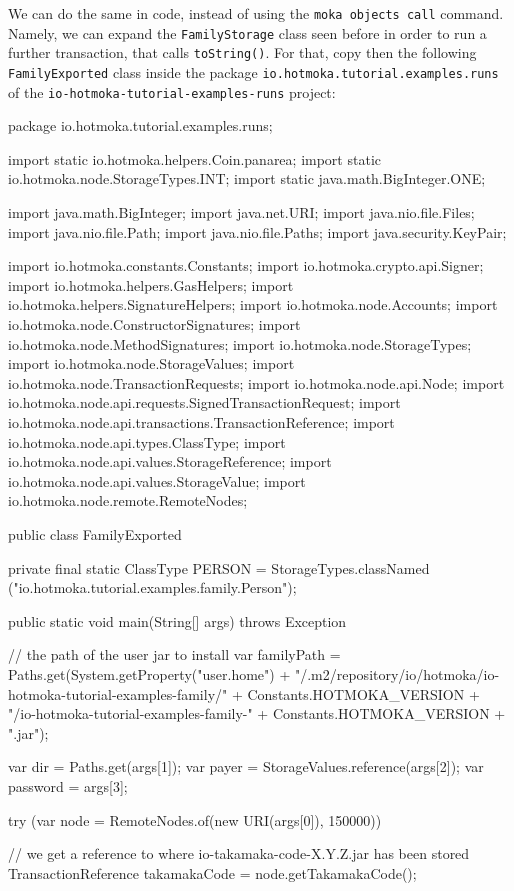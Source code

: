 We can do the same in code, instead of using the \texttt{moka objects call} command.
Namely, we can expand
the \texttt{FamilyStorage} class seen before in order to run a further transaction,
that calls \texttt{toString()}.
For that, copy then the following \texttt{FamilyExported} class inside
the package \texttt{io.hotmoka.tutorial.examples.runs}
of the \texttt{io-hotmoka-tutorial-examples-runs} project:
%
\begin{codebox}\begin{javalst}
package io.hotmoka.tutorial.examples.runs;

import static io.hotmoka.helpers.Coin.panarea;
import static io.hotmoka.node.StorageTypes.INT;
import static java.math.BigInteger.ONE;

import java.math.BigInteger;
import java.net.URI;
import java.nio.file.Files;
import java.nio.file.Path;
import java.nio.file.Paths;
import java.security.KeyPair;

import io.hotmoka.constants.Constants;
import io.hotmoka.crypto.api.Signer;
import io.hotmoka.helpers.GasHelpers;
import io.hotmoka.helpers.SignatureHelpers;
import io.hotmoka.node.Accounts;
import io.hotmoka.node.ConstructorSignatures;
import io.hotmoka.node.MethodSignatures;
import io.hotmoka.node.StorageTypes;
import io.hotmoka.node.StorageValues;
import io.hotmoka.node.TransactionRequests;
import io.hotmoka.node.api.Node;
import io.hotmoka.node.api.requests.SignedTransactionRequest;
import io.hotmoka.node.api.transactions.TransactionReference;
import io.hotmoka.node.api.types.ClassType;
import io.hotmoka.node.api.values.StorageReference;
import io.hotmoka.node.api.values.StorageValue;
import io.hotmoka.node.remote.RemoteNodes;

public class FamilyExported {

  private final static ClassType PERSON = StorageTypes.classNamed
    ("io.hotmoka.tutorial.examples.family.Person");

  public static void main(String[] args) throws Exception {

    // the path of the user jar to install
    var familyPath = Paths.get(System.getProperty("user.home")
    + "/.m2/repository/io/hotmoka/io-hotmoka-tutorial-examples-family/"
    + Constants.HOTMOKA_VERSION
    + "/io-hotmoka-tutorial-examples-family-" + Constants.HOTMOKA_VERSION + ".jar");

    var dir = Paths.get(args[1]);
    var payer = StorageValues.reference(args[2]);
    var password = args[3];

    try (var node = RemoteNodes.of(new URI(args[0]), 150000)) {
      // we get a reference to where io-takamaka-code-X.Y.Z.jar has been stored
      TransactionReference takamakaCode = node.getTakamakaCode();

}}}
\end{javalst}
\end{codebox}
